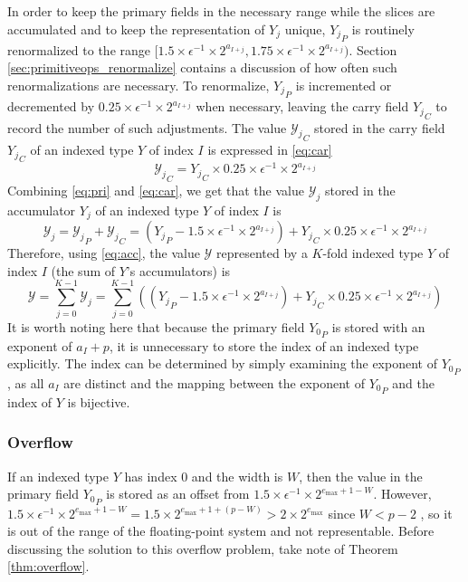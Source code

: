 \documentclass[12pt]{article}
\providecommand{\max}{\ensuremath{\text{max}}}
\theoremstyle{definition}
\numberwithin{equation}{section}
\numberwithin{figure}{section}
\begin{document}
      In order to keep the primary fields in the necessary range while the slices are accumulated and to keep the representation of $Y_j$ unique, ${Y_j}_P$ is routinely renormalized to the range $[1.5 \times\epsilon^{-1} \times 2^{a_{I + j}}, 1.75 \times\epsilon^{-1} \times 2^{a_{I + j}})$. Section \ref{sec:primitiveops_renormalize} contains a discussion of how often such renormalizations are necessary.
      To renormalize, ${Y_j}_P$ is incremented or decremented by $0.25 \times\epsilon^{-1} \times 2^{a_{I + j}}$ when necessary, leaving the carry field ${Y_j}_C$ to record the number of such adjustments.
      The value ${\mathcal{Y}_j}_C$ stored in the carry field ${Y_j}_C$ of an indexed type $Y$ of index $I$ is expressed in \eqref{eq:car}
      \begin{equation}
        {\mathcal{Y}_j}_C = {Y_j}_C \times 0.25\times\epsilon^{-1}\times2^{a_{I + j}}
        \label{eq:car}
      \end{equation}
      Combining \eqref{eq:pri} and \eqref{eq:car}, we get that the value $\mathcal{Y}_j$ stored in the accumulator $Y_j$ of an indexed type $Y$ of index $I$ is
      \begin{equation}
        \mathcal{Y}_j = {\mathcal{Y}_j}_P + {\mathcal{Y}_j}_C = ({Y_j}_P - 1.5 \times\epsilon^{-1}\times 2^{a_{I + j}}) + {Y_j}_C \times 0.25\times\epsilon^{-1}\times2^{a_{I + j}}
        \label{eq:acc}
      \end{equation}
      Therefore, using  \eqref{eq:acc}, the value $\mathcal{Y}$ represented by a $K$-fold indexed type $Y$ of index $I$ (the sum of $Y$'s accumulators) is
      \begin{equation}
        \mathcal{Y} = \sum\limits_{j = 0}^{K - 1} \mathcal{Y}_j = \sum\limits_{j = 0}^{K - 1} (({Y_j}_P - 1.5 \times\epsilon^{-1}\times 2^{a_{I + j}}) + {Y_j}_C \times 0.25\times\epsilon^{-1}\times2^{a_{I + j}})
        \label{eq:indexedvalue}
      \end{equation}
      It is worth noting here that because the primary field ${Y_0}_P$ is stored with an exponent of $a_I + p$, it is unnecessary to store the index of an indexed type explicitly. The index can be determined by simply examining the exponent of ${Y_0}_P$, as all $a_I$ are distinct and the mapping between the exponent of ${Y_0}_P$ and the index of $Y$ is bijective.

    \subsubsection{Overflow}
      \label{sec:indexed_overflow}
      If an indexed type $Y$ has index 0 and the width is $W$, then the value in the primary field ${Y_0}_P$ is stored as an offset from $1.5\times\epsilon^{-1}\times2^{e_{\max} + 1 - W}$. However, $1.5\times\epsilon^{-1}\times2^{e_{\max} + 1 - W} = 1.5 \times 2^{e_{\max} + 1 + (p - W)} > 2 \times 2^{e_{\max}}$ since $W < p - 2$ \cite{repsum}, so it is out of the range of the floating-point system and not representable. Before discussing the solution to this overflow problem, take note of Theorem \ref{thm:overflow}.
\end{document}
